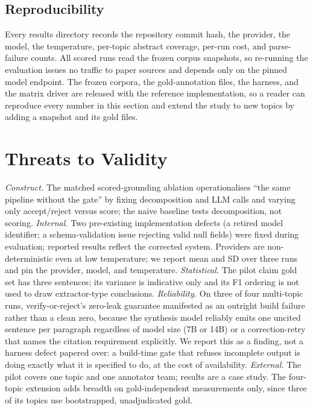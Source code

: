 \documentclass[conference]{IEEEtran}
\newcommand{\NumTopics}{four}
\newcommand{\NumRuns}{three}
\begin{document}
\subsection{Reproducibility}
Every results directory records the repository commit hash, the provider, the
model, the temperature, per-topic abstract coverage, per-run cost, and
parse-failure counts. All scored runs read the frozen corpus snapshots, so
re-running the evaluation issues no traffic to paper sources and depends only on
the pinned model endpoint. The frozen corpora, the gold-annotation files, the
harness, and the matrix driver are released with the reference implementation, so
a reader can reproduce every number in this section and extend the study to new
topics by adding a snapshot and its gold files.

\section{Threats to Validity}
\emph{Construct.} The matched scored-grounding ablation operationalises ``the
same pipeline without the gate'' by fixing decomposition and LLM calls and
varying only accept/reject versus score; the naive baseline tests decomposition,
not scoring.
\emph{Internal.} Two pre-existing implementation defects (a retired model
identifier; a schema-validation issue rejecting valid null fields) were fixed
during evaluation; reported results reflect the corrected system. Providers are
non-deterministic even at low temperature; we report mean and SD over \NumRuns{}
runs and pin the provider, model, and temperature.
\emph{Statistical.} The pilot claim gold set has three sentences; its variance
is indicative only and its F1 ordering is not used to draw extractor-type
conclusions.
\emph{Reliability.} On three of four multi-topic runs, verify-or-reject's
zero-leak guarantee manifested as an outright build failure rather than a
clean zero, because the synthesis model reliably emits one uncited sentence
per paragraph regardless of model size (7B or 14B) or a correction-retry that
names the citation requirement explicitly. We report this as a finding, not a
harness defect papered over: a build-time gate that refuses incomplete output
is doing exactly what it is specified to do, at the cost of availability.
\emph{External.} The pilot covers one topic and one annotator team; results are a
case study. The \NumTopics{}-topic extension adds breadth on gold-independent
measurements only, since three of its topics use bootstrapped, unadjudicated
gold.
\end{document}
